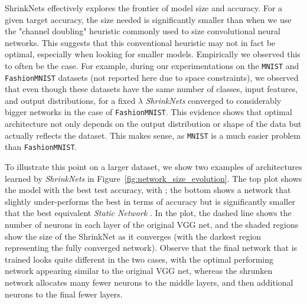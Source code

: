 ShrinkNets effectively explores the frontier of model size and accuracy. For a
given target accuracy, the size needed is significantly smaller than when we use the
"channel doubling" heuristic commonly used to size convolutional neural networks.
This suggests that this conventional heuristic may not in fact be optimal,
especially when looking for smaller models.  Empirically we observed this to
often be the case.  For example, during our experimentations on the
\texttt{MNIST} \cite{Lecun1998} and \texttt{FashionMNIST} \cite{Xiao2017}
datasets (not reported here due to space constraints), we observed that even
though these datasets have the same number of classes, input features, and
output distributions, for a fixed $\lambda$ \textit{ShrinkNets} converged to
considerably bigger networks in the case of \texttt{FashionMNIST}. This evidence
shows that optimal architecture not only depends on the output distribution or
shape of the data but actually reflects the dataset.  This makes sense, as
\texttt{MNIST} is a much easier problem than \texttt{FashionMNIST}.

To illustrate this point on a larger dataset, we show two examples of
architectures learned by \textit{ShrinkNets} in
Figure~\ref{fig:network_size_evolution}.  The top plot shows the model with the
best test accuracy, with ; the bottom shows a network that slightly under-performs the best in
terms of accuracy but is significantly smaller that the best equivalent
\textit{Static Network} .  In the plot, the dashed line
shows the number of neurons in each layer of the original VGG net, and the
shaded regions show the size of the ShrinkNet as it converges (with the darkest
region representing the fully converged network).  Observe that the final
network that is trained looks quite different in the two cases, with the optimal
performing network appearing similar to the original VGG net, whereas the
shrunken network allocates many fewer neurons to the middle layers, and then
additional neurons to the final fewer layers.


